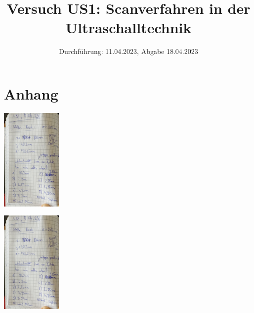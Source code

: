 

\title{Versuch US1:  Scanverfahren in der Ultraschalltechnik}
\date{Durchführung: 11.04.2023, Abgabe 18.04.2023}


\maketitle
\thispagestyle{empty} 
\tableofcontents
\newpage
\setcounter{page}{1}






\printbibliography
\newpage

%

\section*{Anhang}

\begin{minipage}[t]{0.4\textwidth}
    \includegraphics[height=5cm, page=1]{Abbildungen/Buch 14.04.2023.pdf}
\end{minipage}
\begin{minipage}[t]{0.4\textwidth}
    \includegraphics[height=5cm, keepaspectratio, page=2]{Abbildungen/Buch 14.04.2023.pdf}
\end{minipage}


